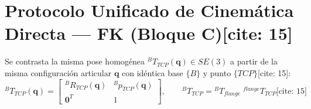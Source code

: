 \documentclass[10pt, a4paper]{article}
\begin{document}
\section{Protocolo Unificado de Cinemática Directa — FK (Bloque C)[cite: 15]}
Se contrasta la misma pose homogénea ${}^BT_{TCP}(\mathbf{q}) \in SE(3)$ a partir de la misma configuración articular $\mathbf{q}$ con idéntica base $\{B\}$ y punto $\{TCP\}$[cite: 15]:
\begin{equation}
    {}^BT_{TCP}(\mathbf{q}) = \begin{bmatrix} {}^BR_{TCP}(\mathbf{q}) & {}^Bp_{TCP}(\mathbf{q}) \\ \mathbf{0}^T & 1 \end{bmatrix}, \qquad
    {}^BT_{TCP} = {}^BT_{flange}\;{}^{flange}T_{TCP} \text{[cite: 15]}
\end{equation}
\end{document}
